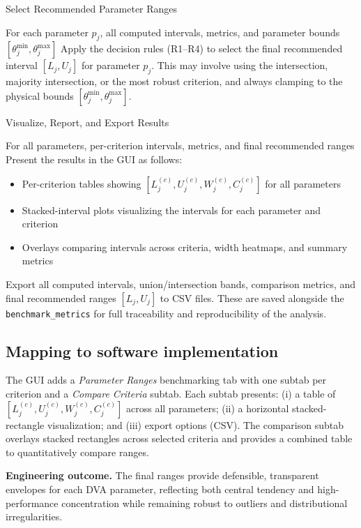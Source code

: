 \documentclass[12pt,a4paper]{article}
\begin{document}
\begin{algorithm}[H]
\caption{Select Recommended Parameter Ranges}
\begin{algorithmic}[1]
\REQUIRE For each parameter $p_j$, all computed intervals, metrics, and parameter bounds $[\theta_j^{\min}, \theta_j^{\max}]$
    \STATE Apply the decision rules (R1--R4) to select the final recommended interval $[L_j, U_j]$ for parameter $p_j$. This may involve using the intersection, majority intersection, or the most robust criterion, and always clamping to the physical bounds $[\theta_j^{\min}, \theta_j^{\max}]$.
\ENDFOR
\end{algorithmic}
\end{algorithm}

\begin{algorithm}[H]
\caption{Visualize, Report, and Export Results}
\begin{algorithmic}[1]
\REQUIRE For all parameters, per-criterion intervals, metrics, and final recommended ranges
\STATE Present the results in the GUI as follows:
    \begin{itemize}
        \item Per-criterion tables showing $[L^{(c)}_j, U^{(c)}_j, W^{(c)}_j, C^{(c)}_j]$ for all parameters
        \item Stacked-interval plots visualizing the intervals for each parameter and criterion
        \item Overlays comparing intervals across criteria, width heatmaps, and summary metrics
    \end{itemize}
\STATE Export all computed intervals, union/intersection bands, comparison metrics, and final recommended ranges $[L_j, U_j]$ to CSV files. These are saved alongside the \texttt{benchmark\_metrics} for full traceability and reproducibility of the analysis.
\end{algorithmic}
\end{algorithm}

\subsection{Mapping to software implementation}
The GUI adds a \emph{Parameter Ranges} benchmarking tab with one subtab per criterion and a \emph{Compare Criteria} subtab. Each subtab presents: (i) a table of $[L^{(c)}_j, U^{(c)}_j, W^{(c)}_j, C^{(c)}_j]$ across all parameters; (ii) a horizontal stacked-rectangle visualization; and (iii) export options (CSV). The comparison subtab overlays stacked rectangles across selected criteria and provides a combined table to quantitatively compare ranges.

\vspace{0.5em}
\noindent\textbf{Engineering outcome.} The final ranges provide defensible, transparent envelopes for each DVA parameter, reflecting both central tendency and high-performance concentration while remaining robust to outliers and distributional irregularities.
\end{document}
